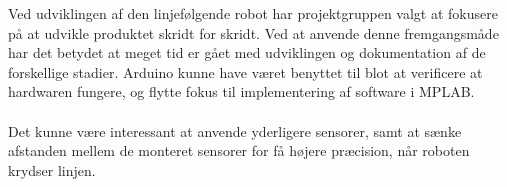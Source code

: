 Ved udviklingen af den linjefølgende robot har projektgruppen valgt at fokusere på at udvikle produktet skridt for skridt. Ved at anvende denne fremgangsmåde har det betydet at meget tid er gået med udviklingen og dokumentation af de forskellige stadier. Arduino kunne have været benyttet til blot at verificere at hardwaren fungere, og flytte fokus til implementering af software i MPLAB.
\\
\\
Det kunne være interessant at anvende yderligere sensorer, samt at sænke  afstanden mellem de monteret sensorer for få højere præcision, når roboten krydser linjen.






